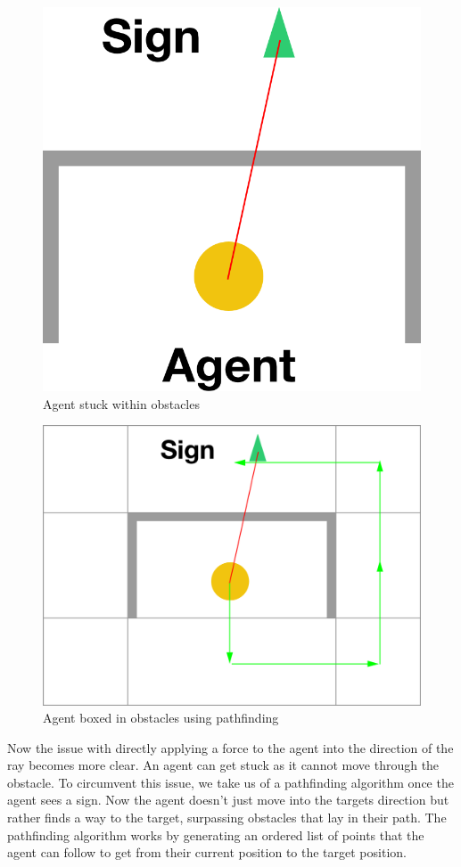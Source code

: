 \documentclass[11pt]{article}
\begin{document}
\begin{itemize}
	\begin{minipage}{.4\textwidth}
		\begin{figure}[H]
			\centering
			\includegraphics[width=.5\linewidth]{assets/without-navmesh}\\
			Agent stuck within obstacles
		\end{figure}
	\end{minipage}
	\begin{minipage}{.2\textwidth}	
	\vfill\hfill
	\end{minipage}
	\begin{minipage}{.4\textwidth}
		\begin{figure}[H]
			\centering
			\includegraphics[width=1\linewidth]{assets/with-navmesh}\\
			Agent boxed in obstacles using pathfinding
		\end{figure}
	\end{minipage}
	
	Now the issue with directly applying a force to the agent into the direction of the ray becomes more clear. An agent can get stuck as it cannot move through the obstacle. To circumvent this issue, we take us of a pathfinding algorithm once the agent sees a sign. Now the agent doesn't just move into the targets direction but rather finds a way to the target, surpassing obstacles that lay in their path. The pathfinding algorithm works by generating an ordered list of points that the agent can follow to get from their current position to the target position.
	

\end{itemize}
\end{document}
